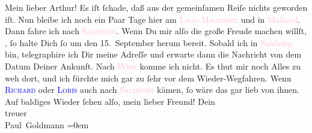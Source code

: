                
            \pend
           \pstart\center{}Mein lieber
               Arthur!\pend\pstart
           Es iſt ſchade, daß aus der gemeinſamen Reiſe nichts geworden iſt. Nun bleibe ich noch
               ein Paar Tage hier am \textsc{\textcolor{pink}{Lago Maggiore}{}\ledrightnote{\textcolor{pink}{Lake Maggiore}}} und in \textcolor{pink}{Mailand}{}\ledrightnote{\textcolor{pink}{Mailand}}. Dann fahre ich nach \textsc{\textcolor{pink}{Salzburg}{}\ledrightnote{\textcolor{pink}{Salzburg}}}. Wenn Du mir alſo die große Freude machen willſt, \label{K_L02714-1v}\label{K_L02714-1h}, ſo halte Dich ſo um den 15. September herum
               bereit. {\pb}Sobald ich in \textcolor{pink}{Salzburg}{}\ledrightnote{\textcolor{pink}{Salzburg}} bin, telegraphire ich Dir meine Adreſſe und \strikeout{\textcolor{gray}{×}} erwarte dann die Nachricht von dem Datum Deiner Ankunft. Nach \textcolor{pink}{Wien}{}\ledrightnote{\textcolor{pink}{Wien}} komme ich nicht. Es thut mir noch Alles zu weh dort, und
               ich fürchte mich gar zu ſehr vor dem Wieder-Wegfahren. Wenn \textsc{\textcolor{blue}{Richard}{}\ledrightnote{\textcolor{blue}{Richard Beer-Hofmann}}} oder \textsc{\textcolor{blue}{Loris}{}\ledrightnote{\textcolor{blue}{Hugo von Hofmannsthal}}} auch nach \textsc{\textcolor{pink}{Salzburg}{}\ledrightnote{\textcolor{pink}{Salzburg}}} kämen, ſo wäre das gar lieb von ihnen.\pend
           \pstart
           Auf baldiges Wieder ſehen alſo, mein lieber Freund!\pend
           \pstart
           Dein {\\[\baselineskip]}treuer {\\[\baselineskip]}\spacefill\mbox{Paul Goldmann}\pend
           \leftskip=0em{}\endnumbering{}  
      